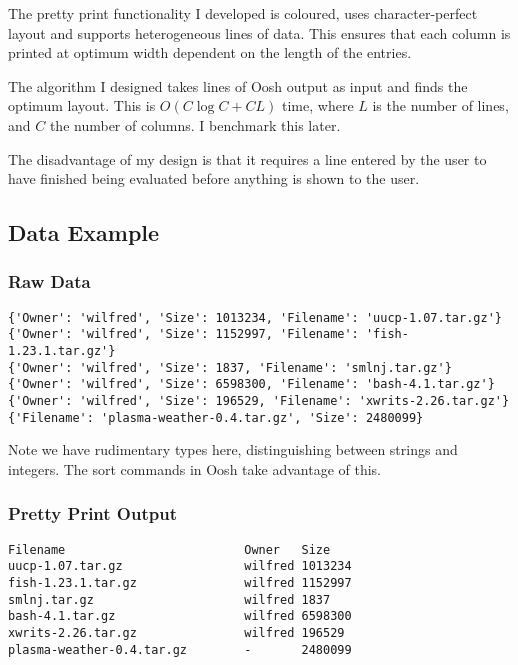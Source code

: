 \documentclass[12pt,twoside,notitlepage]{report}
\begin{document}
The pretty print functionality I developed is coloured, uses character-perfect
layout and supports heterogeneous lines of data. This ensures that each column
is printed at optimum width dependent on the length of the entries.

The algorithm I designed takes lines of Oosh output as input and finds
the optimum layout. This is $O(C \log C + CL)$ time, where $L$ is the
number of lines, and $C$ the number of columns. I benchmark this
later. %

The disadvantage of my design is that it requires a line entered by
the user to have finished being evaluated before anything is shown to
the user.



\subsection{Data Example}
\subsubsection{Raw Data}
\begin{verbatim}
{'Owner': 'wilfred', 'Size': 1013234, 'Filename': 'uucp-1.07.tar.gz'}
{'Owner': 'wilfred', 'Size': 1152997, 'Filename': 'fish-1.23.1.tar.gz'}
{'Owner': 'wilfred', 'Size': 1837, 'Filename': 'smlnj.tar.gz'}
{'Owner': 'wilfred', 'Size': 6598300, 'Filename': 'bash-4.1.tar.gz'}
{'Owner': 'wilfred', 'Size': 196529, 'Filename': 'xwrits-2.26.tar.gz'}
{'Filename': 'plasma-weather-0.4.tar.gz', 'Size': 2480099}
\end{verbatim}
Note we have rudimentary types here, distinguishing between strings and
integers. The sort commands in Oosh take advantage of this.

\subsubsection{Pretty Print Output}
\begin{verbatim}
Filename                         Owner   Size      
uucp-1.07.tar.gz                 wilfred 1013234   
fish-1.23.1.tar.gz               wilfred 1152997   
smlnj.tar.gz                     wilfred 1837      
bash-4.1.tar.gz                  wilfred 6598300   
xwrits-2.26.tar.gz               wilfred 196529    
plasma-weather-0.4.tar.gz        -       2480099
\end{verbatim}
\end{document}
